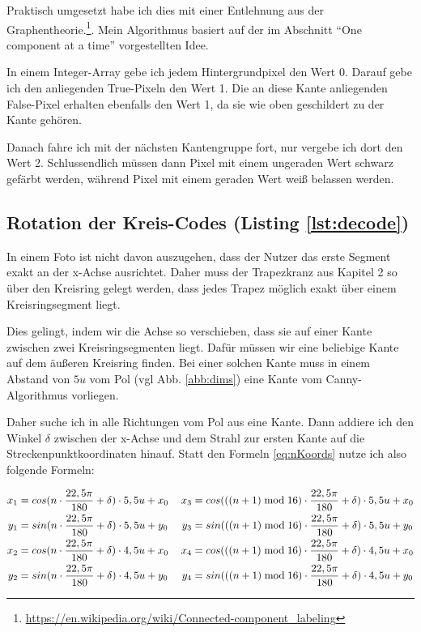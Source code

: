 Praktisch umgesetzt habe ich dies mit einer Entlehnung aus der Graphentheorie.\footnote{\url{https://en.wikipedia.org/wiki/Connected-component_labeling}}. Mein Algorithmus basiert auf der im Abschnitt "`One component at a time"' vorgestellten Idee.

In einem Integer-Array gebe ich jedem Hintergrundpixel den Wert 0. Darauf gebe ich den anliegenden True-Pixeln den Wert 1. Die an diese Kante anliegenden False-Pixel erhalten ebenfalls den Wert 1, da sie wie oben geschildert zu der Kante gehören.

Danach fahre ich mit der nächsten Kantengruppe fort, nur vergebe ich dort den Wert 2. Schlussendlich müssen dann Pixel mit einem ungeraden Wert schwarz gefärbt werden, während Pixel mit einem geraden Wert weiß belassen werden.

\subsection {Rotation der Kreis-Codes (Listing \ref{lst:decode})}
In einem Foto ist nicht davon auszugehen, dass der Nutzer das erste Segment exakt an der x-Achse ausrichtet. Daher muss der Trapezkranz aus Kapitel 2 so über den Kreisring gelegt werden, dass jedes Trapez möglich exakt über einem Kreisringsegment liegt. 

Dies gelingt, indem wir die Achse so verschieben, dass sie auf einer Kante zwischen zwei Kreisringsegmenten liegt. Dafür müssen wir eine beliebige Kante auf dem äußeren Kreisring finden. Bei einer solchen Kante muss in einem Abstand von \(5u\) vom Pol (vgl Abb. \ref{abb:dims}) eine Kante vom Canny-Algorithmus vorliegen.

Daher suche ich in alle Richtungen vom Pol aus eine Kante. Dann addiere ich den Winkel \(\delta\) zwischen der x-Achse und dem Strahl zur ersten Kante auf die Streckenpunktkoordinaten hinauf. Statt den Formeln \ref{eq:nKoords} nutze ich also folgende Formeln:

\begin{gather}
	\begin{split}
		x_1 &= cos(n \cdot \frac{22,5\pi}{180} + \delta) \cdot 5,5u + x_0\\
		y_1 &= sin(n \cdot \frac{22,5\pi}{180} + \delta) \cdot 5,5u + y_0\\ \vspace{2em}
		x_2 &= cos(n \cdot \frac{22,5\pi}{180} + \delta) \cdot 4,5u + x_0\\
		y_2 &= sin(n \cdot \frac{22,5\pi}{180} + \delta) \cdot 4,5u + y_0
	\end{split}
	\hspace{1.2em}
	\begin{split}
		x_3 &= cos(((n+1)\bmod{}16) \cdot \frac{22,5\pi}{180} + \delta) \cdot 5,5u + x_0\\
		y_3 &= sin(((n+1)\bmod{}16) \cdot \frac{22,5\pi}{180} + \delta) \cdot 5,5u + y_0 \\ \vspace{2em}
		x_4 &= cos(((n+1)\bmod{}16) \cdot \frac{22,5\pi}{180} + \delta) \cdot 4,5u + x_0\\
		y_4 &= sin(((n+1)\bmod{}16) \cdot \frac{22,5\pi}{180} + \delta) \cdot 4,5u + y_0
	\end{split} \label{eq:nKoordsNeu}
\end{gather}
